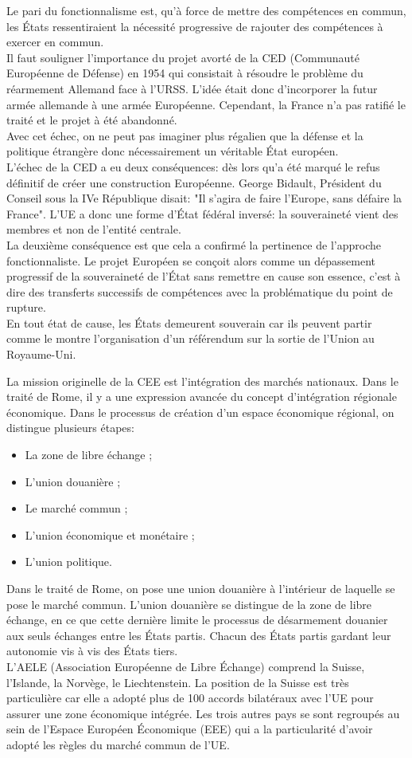 \documentclass[12pt, a4paper, openany]{book}
\begin{document}
Le pari du fonctionnalisme est, qu'à force de mettre des compétences en commun, les États ressentiraient la nécessité progressive de rajouter des compétences à exercer en commun. \\
Il faut souligner l'importance du projet avorté de la CED (Communauté Européenne de Défense) en 1954 qui consistait à résoudre le problème du réarmement Allemand face à l'URSS. L'idée était donc d'incorporer la futur armée allemande à une armée Européenne. Cependant, la France n'a pas ratifié le traité et le projet à été abandonné. \\
Avec cet échec, on ne peut pas imaginer plus régalien que la défense et la politique étrangère donc nécessairement un véritable État européen. \\
L'échec de la CED a eu deux conséquences: dès lors qu'a été marqué le refus définitif de créer une construction Européenne. George Bidault, Président du Conseil sous la IVe République disait: "Il s'agira de faire l'Europe, sans défaire la France". L'UE a donc une forme d'État fédéral inversé: la souveraineté vient des membres et non de l'entité centrale. \\
La deuxième conséquence est que cela a confirmé la pertinence de l'approche fonctionnaliste. Le projet Européen se conçoit alors comme un dépassement progressif de la souveraineté de l'État sans remettre en cause son essence, c'est à dire des transferts successifs de compétences avec la problématique du point de rupture. \\
En tout état de cause, les États demeurent souverain car ils peuvent partir comme le montre l'organisation d'un référendum sur la sortie de l'Union au Royaume-Uni. 


La mission originelle de la CEE est l'intégration des marchés nationaux. Dans le traité de Rome, il y a une expression avancée du concept d'intégration régionale économique. Dans le processus de création d'un espace économique régional, on distingue plusieurs étapes:
\begin{itemize}
\item La zone de libre échange ;
\item L'union douanière ;
\item Le marché commun ;
\item L'union économique et monétaire ;
\item L'union politique.
\end{itemize}

Dans le traité de Rome, on pose une union douanière à l'intérieur de laquelle se pose le marché commun. L'union douanière se distingue de la zone de libre échange, en ce que cette dernière limite le processus de désarmement douanier aux seuls échanges entre les États partis. Chacun des États partis gardant leur autonomie vis à vis des États tiers. \\
L'AELE (Association Européenne de Libre Échange) comprend la Suisse, l'Islande, la Norvège, le Liechtenstein. La position de la Suisse est très particulière car elle a adopté plus de 100 accords bilatéraux avec l'UE pour assurer une zone économique intégrée. Les trois autres pays se sont regroupés au sein de l'Espace Européen Économique (EEE) qui a la particularité d'avoir adopté les règles du marché commun de l'UE. 
\end{document}
